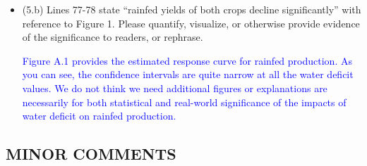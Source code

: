 \documentclass[
]{article}
\begin{document}
\begin{itemize}
\begin{itemize}
  \item (5.b) Lines 77-78 state ``rainfed yields of both crops decline significantly'' with reference to Figure 1. Please quantify, visualize, or otherwise provide evidence of the significance to readers, or rephrase.

  \textcolor{blue}{Figure A.1 provides the estimated response curve for rainfed production. As you can see, the confidence intervals are quite narrow at all the water deficit values. We do not think we need additional figures or explanations are necessarily for both statistical and real-world significance of the impacts of water deficit on rainfed production.}

  \end{itemize}

\end{itemize}

\subsection{MINOR COMMENTS}
\end{document}
